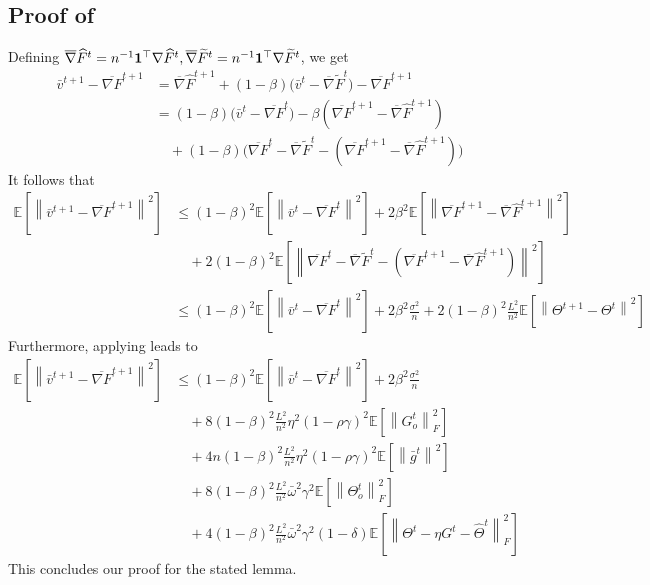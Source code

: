 \documentclass[10pt]{article} %
\theoremstyle{plain}
\theoremstyle{definition}
\theoremstyle{remark}
\newcommand{\bw}{\bar{\omega}}
\newcommand{\avgg}{\bar{g}}
\newcommand{\norm}[1]{\left\| #1 \right\|}
\newcommand{\nl}{\nonumber\\}
\newcommand{\stocgrdF}{\nabla \widehat{F}}
\newcommand{\stocgrdFp}{\nabla \widetilde{F}}
\newcommand{\avgstocgrdF}{\overline{\nabla} \widehat{F}}
\newcommand{\avgstocgrdFp}{\overline{\nabla} \widetilde{F}}
\newcommand{\avggrdF}{\overline{\nabla F}}
\newcommand{\avgv}{\bar{v}}
\begin{document}
\subsection{Proof of } \label{app:vt_bound}
Defining $\avgstocgrdF^{t} = n^{-1} {\bf 1}^\top \stocgrdF^t, \avgstocgrdFp^{t} = n^{-1} {\bf 1}^\top \stocgrdFp^t$, we get
\begin{align}
    \avgv^{t+1} - \avggrdF^{t+1} & = \avgstocgrdF^{t+1} + (1-\beta) \big( \avgv^t - \avgstocgrdFp^t \big) - \avggrdF^{t+1} \\
    & = (1-\beta) \big( \avgv^t - \avggrdF^t \big) - \beta ( \avggrdF^{t+1} - \avgstocgrdF^{t+1} ) \nl
    & \quad + (1-\beta) \big( \avggrdF^t - \avgstocgrdFp^{t} - ( \avggrdF^{t+1} - \avgstocgrdF^{t+1} ) \big) \nonumber
\end{align}
It follows that 
\begin{align*}
    \mathbb{E} \left[ \norm{ \avgv^{t+1} - \avggrdF^{t+1} }^2 \right] & \leq (1-\beta)^2 \mathbb{E} \left[ \norm{ \avgv^{t} - \avggrdF^{t} }^2 \right] + 2 \beta^2 \mathbb{E} \left[ \norm{\avggrdF^{t+1} - \avgstocgrdF^{t+1} }^2 \right] \\
    & \quad + 2(1-\beta)^2 \mathbb{E} \left[ \norm{ \avggrdF^t - \avgstocgrdFp^{t} - ( \avggrdF^{t+1} - \avgstocgrdF^{t+1} ) }^2 \right] \\
    & \leq (1-\beta)^2 \mathbb{E} \left[ \norm{ \avgv^{t} - \avggrdF^{t} }^2 \right] + 2 \beta^2 \frac{\sigma^2}{n} + 2(1-\beta)^2 \frac{L^2}{n^2} \mathbb{E} \left[ \norm{ \Theta^{t+1} - \Theta^t }^2 \right]
\end{align*}
Furthermore, applying  leads to 
\begin{equation}
\begin{split}
    \mathbb{E} \left[ \norm{ \avgv^{t+1} - \avggrdF^{t+1} }^2 \right] & \leq (1-\beta)^2 \mathbb{E} \left[ \norm{ \avgv^{t} - \avggrdF^{t} }^2 \right]  + 2 \beta^2 \frac{\sigma^2}{n} \\
    & \quad + 8 (1-\beta)^2 \frac{L^2}{n^2} \eta^2(1-\rho\gamma)^2 \mathbb{E} \left[ \norm{G_o^t}_F^2 \right] \\
    & \quad + 4n (1-\beta)^2 \frac{L^2}{n^2}  \eta^2(1-\rho\gamma)^2 \mathbb{E} \left[ \norm{ \avgg^t }^2 \right] \\
    & \quad + 8 (1-\beta)^2 \frac{L^2}{n^2} \bw^2 \gamma^2 \mathbb{E} \left[ \norm{\Theta_o^t}_F^2 \right] \\
    & \quad + 4 (1-\beta)^2 \frac{L^2}{n^2} \bw^2 \gamma^2(1-\delta) \mathbb{E} \left[ \norm{\Theta^t - \eta G^t - \hat{\Theta}^t}_F^2 \right]
\end{split}
\end{equation}
This concludes our proof for the stated lemma. 
\end{document}
